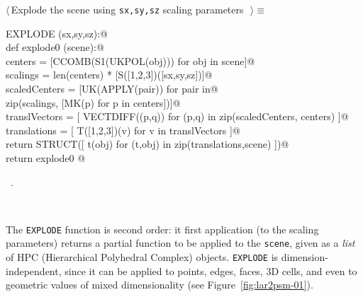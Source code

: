 \documentclass[11pt,oneside]{article}	%
\begin{document}
\begin{flushleft} \small
\begin{minipage}{\linewidth} \label{scrap11}
$\langle\,$Explode the scene using \texttt{sx,sy,sz} scaling parameters\nobreak\ {\footnotesize {}}$\,\rangle\equiv$
\vspace{-1ex}
\begin{list}{}{} \item
\mbox{}\verb@def EXPLODE (sx,sy,sz):@\\
\mbox{}\verb@    def explode0 (scene):@\\
\mbox{}\verb@        centers = [CCOMB(S1(UKPOL(obj))) for obj in scene]@\\
\mbox{}\verb@        scalings = len(centers) * [S([1,2,3])([sx,sy,sz])]@\\
\mbox{}\verb@        scaledCenters = [UK(APPLY(pair)) for pair in@\\
\mbox{}\verb@                         zip(scalings, [MK(p) for p in centers])]@\\
\mbox{}\verb@        translVectors = [ VECTDIFF((p,q)) for (p,q) in zip(scaledCenters, centers) ]@\\
\mbox{}\verb@        translations = [ T([1,2,3])(v) for v in translVectors ]@\\
\mbox{}\verb@        return STRUCT([ t(obj) for (t,obj) in zip(translations,scene) ])@\\
\mbox{}\verb@    return explode0  @\\
\mbox{}\verb@@{\NWsep}
\end{list}
\vspace{-1ex}
\footnotesize\addtolength{\baselineskip}{-1ex}
\begin{list}{}{\setlength{\itemsep}{-\parsep}\setlength{\itemindent}{-\leftmargin}}
\item \NWtxtMacroRefIn\ .
\end{list}
\end{minipage}\\[4ex]
\end{flushleft}

The \texttt{EXPLODE} function is second order: it first application (to the scaling parameters) returns a partial function to be applied to the \texttt{scene}, given as a \emph{list} of HPC (Hierarchical Polyhedral Complex) objects. 
\texttt{EXPLODE} is dimension-independent, since it can be applied to points, edges, faces, 3D cells, and even to geometric values of mixed dimensionality (see Figure~\ref{fig:lar2psm-01}).
\end{document}
